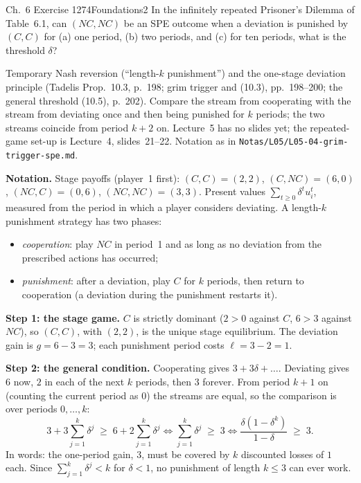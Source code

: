 \begin{exsol}{\MG{} Ch.~6 Exercise 1}{274}{Foundations}{2}
\asked In the infinitely repeated Prisoner's Dilemma of Table~6.1, can $(NC,NC)$ be an SPE outcome
when a deviation is punished by $(C,C)$ for (a) one period, (b) two periods, and (c) for ten
periods, what is the threshold $\delta$?

\method Temporary Nash reversion (``length-$k$ punishment'') and the one-stage deviation principle
(Tadelis Prop.~10.3, p.~198; grim trigger and (10.3), pp.~198--200; the general threshold (10.5),
p.~202). Compare the stream from cooperating with the stream from deviating once and then being
punished for $k$ periods; the two streams coincide from period $k+2$ on. Lecture~5 has no slides
yet; the repeated-game set-up is Lecture~4, slides~21--22. Notation as in
\texttt{Notas/L05/L05-04-grim-trigger-spe.md}.

\solution
\textbf{Notation.} Stage payoffs (player~1 first): $(C,C) = (2,2)$, $(C,NC) = (6,0)$, $(NC,C) =
(0,6)$, $(NC,NC) = (3,3)$. Present values $\sum_{t\ge0}\delta^t u_i^t$, measured from the period in
which a player considers deviating. A length-$k$ punishment strategy has two phases:
\begin{itemize}
  \item \emph{cooperation}: play $NC$ in period~1 and as long as no deviation from the prescribed
  actions has occurred;
  \item \emph{punishment}: after a deviation, play $C$ for $k$ periods, then return to cooperation
  (a deviation during the punishment restarts it).
\end{itemize}

\textbf{Step 1: the stage game.} $C$ is strictly dominant ($2 > 0$ against $C$, $6 > 3$ against
$NC$), so $(C,C)$, with $(2,2)$, is the unique stage equilibrium. The deviation gain is
$g = 6 - 3 = 3$; each punishment period costs $\ell = 3 - 2 = 1$.

\textbf{Step 2: the general condition.} Cooperating gives $3 + 3\delta + \dots$. Deviating gives
$6$ now, $2$ in each of the next $k$ periods, then $3$ forever. From period $k+1$ on (counting the
current period as 0) the streams are equal, so the comparison is over periods $0, \dots, k$:
\[
  3 + 3\sum_{j=1}^{k}\delta^j \;\ge\; 6 + 2\sum_{j=1}^{k}\delta^j
  \iff \sum_{j=1}^{k}\delta^j \;\ge\; 3
  \iff \frac{\delta(1-\delta^k)}{1-\delta} \;\ge\; 3 .
\]
In words: the one-period gain, $3$, must be covered by $k$ discounted losses of $1$ each. Since
$\sum_{j=1}^k \delta^j < k$ for $\delta < 1$, no punishment of length $k \le 3$ can ever work.


\end{exsol}
